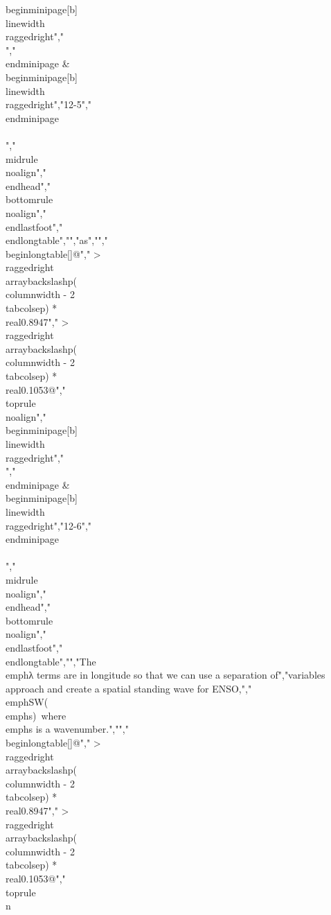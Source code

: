 {{{{{{{{{{begin{minipage}[b]{\\linewidth}\\raggedright","\\[\\begin{array}{r}","\\frac{\\partial u}{\\partial t} = - \\frac{1}{a}\\frac{\\partial}{\\partial\\lambda}(g\\zeta + U) \\\\","\\ \\ \\ \\frac{\\partial v}{\\partial t} = - \\frac{1}{a}\\frac{\\partial}{\\partial\\varphi}(g\\zeta + U)","\\end{array}\\ \\]","\\end{minipage} & \\begin{minipage}[b]{\\linewidth}\\raggedright","12-5","\\end{minipage} \\\\","\\midrule\\noalign{}","\\endhead","\\bottomrule\\noalign{}","\\endlastfoot","\\end{longtable}","","as","","\\begin{longtable}[]{@{}","  >{\\raggedright\\arraybackslash}p{(\\columnwidth - 2\\tabcolsep) * \\real{0.8947}}","  >{\\raggedright\\arraybackslash}p{(\\columnwidth - 2\\tabcolsep) * \\real{0.1053}}@{}}","\\toprule\\noalign{}","\\begin{minipage}[b]{\\linewidth}\\raggedright","\\[\\begin{array}{r}","a^{2}\\frac{\\partial^{2}\\zeta}{\\partial t^{2}} - D\\lbrack\\frac{\\partial}{\\partial\\lambda}(\\frac{\\partial}{\\partial\\lambda}(g\\zeta + U)) + \\frac{\\partial}{\\partial\\varphi}(\\frac{\\partial}{\\partial\\varphi}(g\\zeta + U))\\rbrack = 0","\\end{array}\\]","\\end{minipage} & \\begin{minipage}[b]{\\linewidth}\\raggedright","12-6","\\end{minipage} \\\\","\\midrule\\noalign{}","\\endhead","\\bottomrule\\noalign{}","\\endlastfoot","\\end{longtable}","","The \\emph{λ} terms are in longitude so that we can use a separation of","variables approach and create a spatial standing wave for ENSO,","\\emph{SW}(\\emph{s})~where \\emph{s} is a wavenumber.","","\\begin{longtable}[]{@{}","  >{\\raggedright\\arraybackslash}p{(\\columnwidth - 2\\tabcolsep) * \\real{0.8947}}","  >{\\raggedright\\arraybackslash}p{(\\columnwidth - 2\\tabcolsep) * \\real{0.1053}}@{}}","\\toprule\\n}}}}}}}}}}
